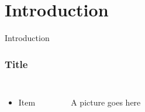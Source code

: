 \documentclass{beamer}
\begin{document}
\begin{frame}
\titlepage

\setcounter{tocdepth}{1}
\tableofcontents
\end{frame}

\section{Introduction} %
\begin{frame}
\centering \huge Introduction
\end{frame}

\begin{frame}
\frametitle{Title}
\begin{columns}[t]
  \begin{itemize}
    \item Item
  \end{itemize}
  \begin{figure}
    A picture goes here
  \end{figure}
\end{columns}
\end{frame}
\end{document}
